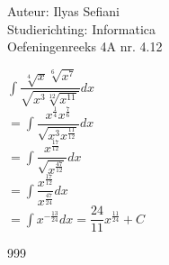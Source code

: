 \documentclass[a4paper]{article}
\begin{document}
\noindent \large Auteur: Ilyas Sefiani \\
\noindent \large Studierichting: Informatica\\
\noindent \large Oefeningenreeks 4A nr. 4.12\\

\medskip

\normalsize

$\displaystyle\int \dfrac{\sqrt[4]{x}\sqrt[6]{x^7}}{\sqrt{x^3\sqrt[12]{x^{11}}}}dx$\\

$= \displaystyle\int \dfrac{x^{\tfrac{1}{4}}x^{\tfrac{7}{6}}}{\sqrt{x^3x^{\tfrac{11}{12}}}}dx$\\

$= \displaystyle\int \dfrac{x^{\tfrac{17}{12}}}{\sqrt{x^{\tfrac{47}{12}}}}dx$\\

$= \displaystyle\int \dfrac{x^{\tfrac{17}{12}}}{x^{\tfrac{47}{24}}}dx$\\

$= \displaystyle\int x^{-\tfrac{13}{24}}dx = \dfrac{24}{11}x^{\tfrac{11}{24}} + C$\\

\begin{thebibliography}{999}
\end{thebibliography}
\end{document}
